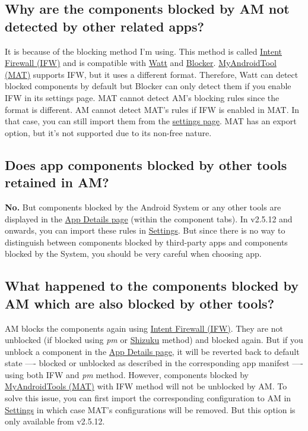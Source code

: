 \subsection{Why are the components blocked by AM not detected by other related apps?} %
It is because of the blocking method I'm using. This method is called
\href{https://carteryagemann.com/pages/android-intent-firewall.html}{Intent Firewall (IFW)} and is compatible with
\href{https://github.com/tuyafeng/Watt}{Watt} and \href{https://github.com/lihenggui/blocker}{Blocker}.
\href{https://www.myandroidtools.com}{MyAndroidTool (MAT)} supports IFW, but it uses a different format. Therefore,
Watt can detect blocked components by default but Blocker can only detect them if you enable IFW in its settings page.
MAT cannot detect AM's blocking rules since the format is different. AM cannot detect MAT's rules if IFW is enabled in
MAT. In that case, you can still import them from the \hyperref[sec:settings-page]{settings page}. MAT has an export
option, but it's not supported due to its non-free nature.

\subsection{Does app components blocked by other tools retained in AM?} %
\textbf{No.} But components blocked by the Android System or any other tools are displayed in the
\hyperref[sec:app-details-page]{App Details page} (within the component tabs). In v2.5.12 and onwards, you can import
these rules in \hyperref[par:import-existing-rules]{Settings}. But since there is no way to distinguish between
components blocked by third-party apps and components blocked by the System, you should be very careful when choosing
app.

\subsection{What happened to the components blocked by AM which are also blocked by other tools?} %
AM blocks the components again using
\href{https://carteryagemann.com/pages/android-intent-firewall.html}{Intent Firewall (IFW)}. They are not unblocked (if
blocked using \textit{pm} or \href{https://github.com/RikkaApps/Shizuku}{Shizuku} method) and blocked again. But if you
unblock a component in the \hyperref[sec:app-details-page]{App Details page}, it will be reverted back to default state
—- blocked or unblocked as described in the corresponding app manifest —- using both IFW and \textit{pm} method.
However, components blocked by \href{https://www.myandroidtools.com}{MyAndroidTools (MAT)} with IFW method will not be
unblocked by AM. To solve this issue, you can first import the corresponding configuration to AM in
\hyperref[par:import-existing-rules]{Settings} in which case MAT's configurations will be removed. But this option is
only available from v2.5.12.

